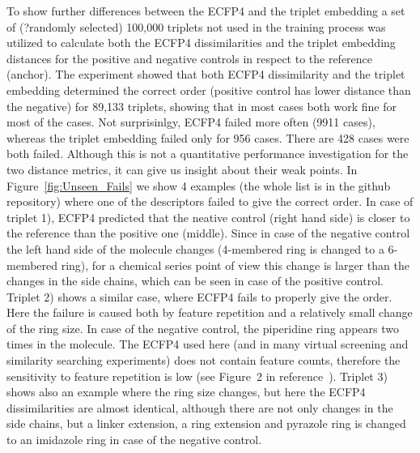 \documentclass[doublespacing]{bmcart}
\begin{document}
To show further differences between the ECFP4 and the triplet embedding a set of (?randomly selected) 100,000 triplets not used in the training process was utilized to calculate  both the ECFP4 dissimilarities and the triplet embedding distances for the positive and negative controls in respect to the reference (anchor). The experiment showed that both ECFP4 dissimilarity and the triplet embedding determined the correct order (positive control has lower distance than the negative) for 89,133 triplets, showing that in most cases both work fine for most of the cases. Not surprisinlgy, ECFP4 failed more often (9911 cases), whereas the triplet embedding failed only for 956 cases. There are 428 cases were both failed. Although this is not a quantitative performance investigation for the two distance metrics, it can give us insight about their weak points. In Figure~\ref{fig:Unseen_Fails} we show 4 examples (the whole list is in the github repository) where one of the descriptors failed to give the correct order. In case of triplet 1), ECFP4 predicted that the neative control (right hand side) is closer to the reference than the positive one (middle). Since in case of the negative control the left hand side of the molecule changes (4-membered ring is changed to a 6-membered ring), for a chemical series point of view this change is larger than the changes in the side chains, which can be seen in case of the positive control.
Triplet 2) shows a similar case, where ECFP4 fails to properly give the order. Here the failure is caused both by feature repetition and a relatively small change of the ring size. In case of the negative control, the piperidine ring appears two times in the molecule. The ECFP4 used here (and in many virtual screening and similarity searching experiments) does not contain feature counts, therefore the sensitivity to feature repetition is low (see Figure~2 in reference~\cite{flower1998properties}). Triplet 3) shows also an example where the ring size changes, but here the ECFP4 dissimilarities are almost identical, although there are not only changes in the side chains, but a linker extension, a ring extension and pyrazole ring is changed to an imidazole ring in case of the negative control. 
\end{document}
